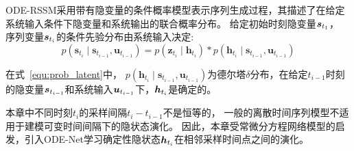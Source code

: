 
ODE-RSSM采用带有隐变量的条件概率模型表示序列生成过程，其描述了在给定系统输入条件下隐变量和系统输出的联合概率分布。
给定初始时刻隐变量$\boldsymbol{s}_{t_1}$， 序列变量$\boldsymbol{s}_{t_i}$的条件先验分布由系统输入决定:
\begin{equation}
p\left(\boldsymbol{s}_{t_{i}} \mid \boldsymbol{s}_{t_{i-1}}, \boldsymbol{u}_{t_{i-1}}\right)=p\left(\boldsymbol{z}_{t_{i}} \mid \boldsymbol{h}_{t_{i}}\right)*
p\left(\boldsymbol{h}_{t_{i}} \mid \boldsymbol{s}_{t_{i-1}}, \boldsymbol{u}_{t_{i-1}}\right)
\label{equ:prob_latent}
\end{equation}

在式~\eqref{equ:prob_latent}中， $p\left(\boldsymbol{h}_{t_{i}} \mid \boldsymbol{s}_{t_{i-1}}, \boldsymbol{u}_{t_{i-1}}\right)$为德尔塔$\delta$分布，在给定$t_{i-1}$时刻的隐变量$\boldsymbol{s}_{t_{i-1}}$和系统输入$\boldsymbol{u}_{t_{i-1}}$下，$\boldsymbol{h}_{t_i}$是确定的。

本章中不同时刻$t_i$的采样间隔$t_i - t_{i-1}$不是恒等的，
一般的离散时间序列模型不适用于建模可变时间间隔下的隐状态演化。
因此，本章受常微分方程网络模型\cite{chen2018neuralode,Rubanova2019}的启发，引入ODE-Net学习确定性隐状态$\boldsymbol{h}_{t_i}$在相邻采样时间点之间的演化。

